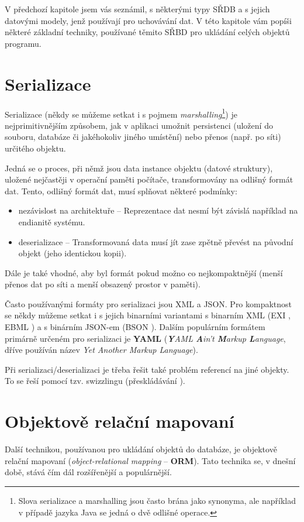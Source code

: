V předchozí kapitole jsem vás seznámil, s některými typy SŘDB a s jejich datovými modely, jenž používají pro uchovávání dat. V této kapitole vám popíši některé základní techniky, používané těmito SŘBD pro ukládání celých objektů programu.

\section{Serializace}
Serializace (někdy se můžeme setkat i s pojmem \emph{marshalling}\footnote{Slova serializace a marshalling jsou často brána jako synonyma, ale například v případě jazyka Java se jedná o dvě odlišné operace.\cite{rfc:2713}}) je nejprimitivnějším způsobem, jak v aplikaci umožnit persistenci (uložení do souboru, databáze či jakéhokoliv jiného umístění) nebo přenos (např. po síti) určitého objektu.

Jedná se o proces, při němž jsou data instance objektu (datové struktury), uložené nejčastěji v operační paměti počítače, transformovány na odlišný formát dat. Tento, odlišný formát dat, musí splňovat některé podmínky:

\begin{itemize}
\item nezávislost na architektuře -- Reprezentace dat nesmí být závislá například na endianitě systému.
\item deserializace -- Transformovaná data musí jít zase zpětně převést na původní objekt (jeho identickou kopii).
\end{itemize}

Dále je také vhodné, aby byl formát pokud možno co nejkompaktnější (menší přenos dat po síti a menší obsazený prostor v paměti).

Často používanými formáty pro serializaci jsou XML a JSON. Pro kompaktnost se někdy můžeme setkat i s jejich binarními variantami s binarním XML (EXI \cite{w3c:exi}, EBML \cite{rfc:ebml}) a s binárním JSON-em (BSON \cite{bson:spec}). Dalším populárním formátem primárně určeném pro serializaci je \textbf{YAML} \cite{rfc:yaml} (\emph{\textbf{Y}AML \textbf{A}in’t \textbf{M}arkup \textbf{L}anguage}, dříve používán název \emph{Yet Another Markup Language}).

Při serializaci/deserializaci je třeba řešit také problém referencí na jiné objekty. To se řeší pomocí tzv. swizzlingu (přeskládávání \cite{wiki:swizz}).

\section{Objektově relační mapovaní}
Další technikou, používanou pro ukládání objektů do databáze, je objektově relační mapovaní (\emph{object-relational mapping} -- \textbf{ORM}). Tato technika se, v dnešní době, stává čím dál rozšířenější a populárnější.

